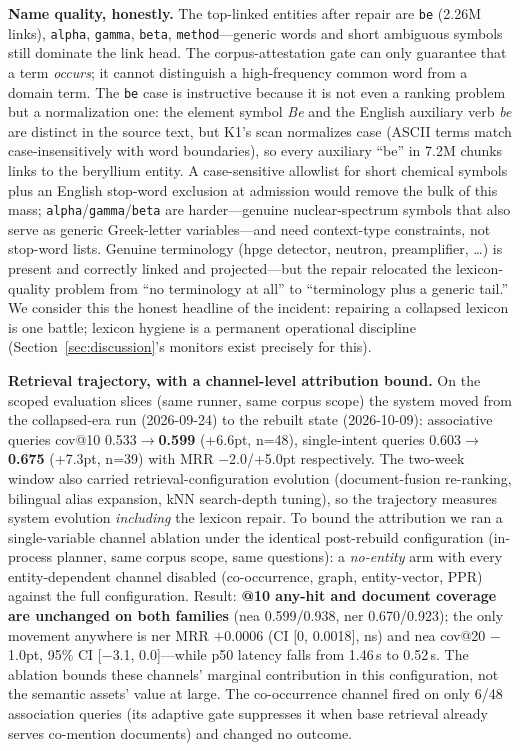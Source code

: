 \documentclass[preprint,12pt]{elsarticle}
\begin{document}
\textbf{Name quality, honestly.} The top-linked entities after repair are
\texttt{be} (2.26M links), \texttt{alpha}, \texttt{gamma}, \texttt{beta},
\texttt{method}---generic words and short ambiguous symbols still dominate
the link head. The corpus-attestation gate can only guarantee that a term
\emph{occurs}; it cannot distinguish a high-frequency common word from a
domain term. The \texttt{be} case is instructive because it is not even a
ranking problem but a normalization one: the element symbol \emph{Be} and
the English auxiliary verb \emph{be} are distinct in the source text, but
K1's scan normalizes case (ASCII terms match case-insensitively with word
boundaries), so every auxiliary ``be'' in 7.2M chunks links to the
beryllium entity. A case-sensitive allowlist for short chemical symbols
plus an English stop-word exclusion at admission would remove the bulk of
this mass; \texttt{alpha}/\texttt{gamma}/\texttt{beta} are harder---genuine
nuclear-spectrum symbols that also serve as generic Greek-letter
variables---and need context-type constraints, not stop-word lists.
Genuine terminology (hpge detector, neutron, preamplifier, \ldots) is
present and correctly linked and projected---but the repair relocated the
lexicon-quality problem from ``no terminology at all'' to ``terminology plus
a generic tail.'' We consider this the honest headline of the incident:
repairing a collapsed lexicon is one battle; lexicon hygiene is a permanent
operational discipline (Section~\ref{sec:discussion}'s monitors exist
precisely for this).

\textbf{Retrieval trajectory, with a channel-level attribution bound.} On
the scoped evaluation slices (same runner, same corpus scope) the system
moved from the collapsed-era run (2026-09-24) to the rebuilt state
(2026-10-09): associative queries cov@10 0.533$\to$\textbf{0.599} (+6.6pt,
n=48), single-intent queries 0.603$\to$\textbf{0.675} (+7.3pt, n=39) with
MRR $-$2.0/+5.0pt respectively. The two-week window also carried
retrieval-configuration evolution (document-fusion re-ranking, bilingual
alias expansion, kNN search-depth tuning), so the trajectory measures
system evolution \emph{including} the lexicon repair. To bound the
attribution we ran a single-variable channel ablation under the identical
post-rebuild configuration (in-process planner, same corpus scope, same
questions): a \emph{no-entity} arm with every entity-dependent channel
disabled (co-occurrence, graph, entity-vector, PPR) against the full
configuration. Result: \textbf{@10 any-hit and document coverage are
unchanged on both families} (nea 0.599/0.938, ner 0.670/0.923); the
only movement anywhere is ner MRR $+$0.0006 (CI [0, 0.0018], ns) and
nea cov@20 $-$1.0pt, 95\% CI [$-$3.1, 0.0]---while p50 latency falls
from 1.46\,s to 0.52\,s. The ablation bounds these channels' marginal
contribution in this configuration, not the semantic assets' value at
large. The
co-occurrence channel fired on only 6/48 association queries (its adaptive
gate suppresses it when base retrieval already serves co-mention
documents) and changed no outcome.
\end{document}
